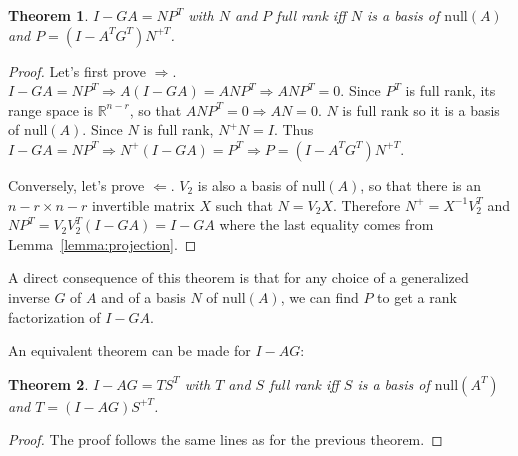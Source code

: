 \documentclass[]{article}
\newtheorem{theorem}{Theorem}[section]
\theoremstyle{definition}
\begin{document}
\begin{theorem}
\label{th:NP}
  $I-GA = N P^T$ with $N$ and $P$ full rank iff $N$ is a basis of $\mathrm{null}(A)$ and $P = (I-A^TG^T)N^{+T}$.
\end{theorem}
\begin{proof}
  Let's first prove $\Longrightarrow$.
	\newline
	$I-GA = N P^T \Longrightarrow A(I-GA) = A N P^T \Longrightarrow ANP^T=0$. Since $P^T$ is full rank, its range space is $\mathbb{R}^{n-r}$, so that $ANP^T=0 \Longrightarrow AN = 0$. $N$ is full rank so it is a basis of $\mathrm{null}(A)$.
\newline
	Since $N$ is full rank, $N^+ N = I$. Thus $I-GA = N P^T \Longrightarrow N^+(I-GA) = P^T \Longrightarrow P = (I-A^TG^T)N^{+T}$.

	Conversely, let's prove $\Longleftarrow$.
  \newline
	$V_2$ is also a basis of $\mathrm{null}(A)$, so that there is an $n-r \times n-r$ invertible matrix $X$ such that $N = V_2 X$. Therefore $N^+ = X^{-1} V_2^T$ and $N P^T = V_2 V_2^T (I-GA) = I-GA$ where the last equality comes from Lemma~\ref{lemma:projection}.
\end{proof}
A direct consequence of this theorem is that for any choice of a generalized inverse $G$ of $A$ and of a basis $N$ of $\mathrm{null}(A)$, we can find $P$ to get a rank factorization of $I-GA$.

An equivalent theorem can be made for $I-AG$:
\begin{theorem}
\label{th:TS}
  $I-AG = T S^T$ with $T$ and $S$ full rank iff $S$ is a basis of $\mathrm{null}(A^T)$ and $T = (I-AG)S^{+T}$.
\end{theorem}
\begin{proof}
	The proof follows the same lines as for the previous theorem.
\end{proof}
\end{document}
